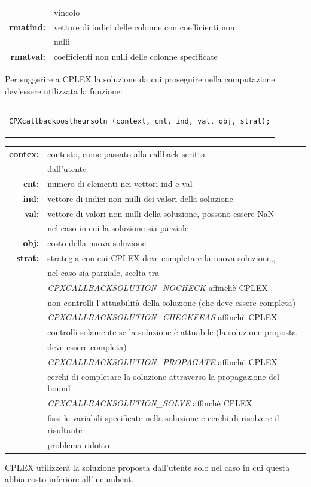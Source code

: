 \begin{center}
\begin{center}
\begin{table}[h]
\begin{tabular}{rl}
&{vincolo}\\
\textbf{rmatind:} & {vettore di indici delle colonne con coefficienti non}\\
&{nulli}\\
\textbf{rmatval:} & {coefficienti non nulli delle colonne specificate}\\
\end{tabular}
\end{table}
Per suggerire a CPLEX la soluzione da cui proseguire nella computazione dev'essere utilizzata la funzione:
\begin{center}
\begin{tabular}{c}
\begin{lstlisting}[linewidth=365pt, basicstyle=\footnotesize\sffamily,]    
CPXcallbackpostheursoln (context, cnt, ind, val, obj, strat);
\end{lstlisting}
\end{tabular}
\end{center}
\begin{table}[h]
\centering
\begin{tabular}{rl}
\textbf{contex:} & {contesto, come passato alla callback scritta}\\
&{dall'utente}\\
\textbf{cnt:} & {numero di elementi nei vettori ind e val}\\
\textbf{ind:} & {vettore di indici non nulli dei valori della soluzione}\\
\textbf{val:} & {vettore di valori non nulli della soluzione, possono essere NaN}\\
&{nel caso in cui la soluzione sia parziale}\\
\textbf{obj:} & {costo della nuova soluzione}\\
\textbf{strat:} & {strategia con cui CPLEX deve completare la nuova soluzione,,}\\
&{ nel caso sia parziale, scelta tra}\\
&{\textit{CPXCALLBACKSOLUTION\_NOCHECK} affinchè CPLEX}\\ 
&{non controlli l'attuabilità della soluzione (che deve essere completa) }\\
&{\textit{CPXCALLBACKSOLUTION\_CHECKFEAS} affinchè CPLEX}\\
&{ controlli solamente se la soluzione è attuabile (la soluzione proposta }\\
&{deve essere completa)}\\
&{\textit{CPXCALLBACKSOLUTION\_PROPAGATE} affinchè CPLEX }\\
&{cerchi di completare la soluzione attraverso la propagazione del bound}\\
&{\textit{CPXCALLBACKSOLUTION\_SOLVE} affinchè CPLEX}\\ 
&{fissi le variabili specificate nella soluzione e cerchi di risolvere il risultante }\\
&{problema ridotto}\\
\end{tabular}
\end{table}
CPLEX utilizzerà la soluzione proposta dall'utente solo nel caso in cui questa abbia costo inferiore all'incumbent. 

\end{center}
\end{center}
